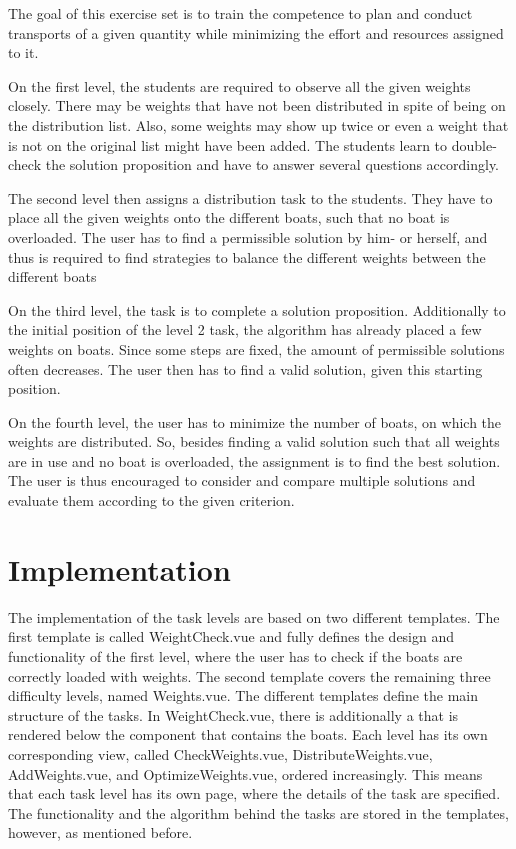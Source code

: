 The goal of this exercise set is to train the competence to plan and conduct transports of a given quantity while minimizing the effort and resources assigned to it. 

On the first level, the students are required to observe all the given weights closely. There may be weights that have not been distributed in spite of being on the distribution list. Also, some weights may show up twice or even a weight that is not on the original list might have been added. The students learn to double-check the solution proposition and have to answer several questions accordingly.

The second level then assigns a distribution task to the students. They have to place all the given weights onto the different boats, such that no boat is overloaded. The user has to find a permissible solution by him- or herself, and thus is required to find strategies to balance the different weights between the different boats

On the third level, the task is to complete a solution proposition. Additionally to the initial position of the level 2 task, the algorithm has already placed a few weights on boats. Since some steps are fixed, the amount of permissible solutions often decreases. The user then has to find a valid solution, given this starting position.

On the fourth level, the user has to minimize the number of boats, on which the weights are distributed. So, besides finding a valid solution such that all weights are in use and no boat is overloaded, the assignment is to find the best solution. The user is thus encouraged to consider and compare multiple solutions and evaluate them according to the given criterion.


\section{Implementation}
\label{section:implementation}
The implementation of the task levels are based on two different templates. The first template is called WeightCheck.vue and fully defines the design and functionality of the first level, where the user has to check if the boats are correctly loaded with weights. The second template covers the remaining three difficulty levels, named Weights.vue. The different templates define the main structure of the tasks. In WeightCheck.vue, there is additionally a  that is rendered below the component that contains the boats.
Each level has its own corresponding view, called CheckWeights.vue, DistributeWeights.vue, AddWeights.vue, and OptimizeWeights.vue, ordered increasingly. This means that each task level has its own page, where the details of the task are specified. The functionality and the algorithm behind the tasks are stored in the templates, however, as mentioned before.

